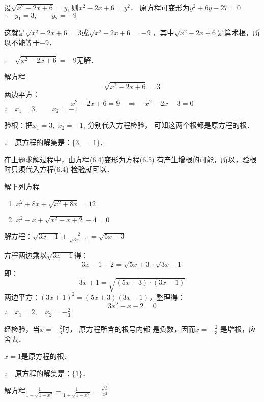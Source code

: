 \begin{solution}
    设$\sqrt{x^2-2x+6}=y$, 则$x^2-2x+6=y^2$．
原方程可变形为$y^2+6y-27=0$
$\because\quad y_1=3,\qquad y_2=-9$

这就是$\sqrt{x^2-2x+6}=3$或$\sqrt{x^2-2x+6}=-9$
，其中$\sqrt{x^2-2x+6}$是算术根，所以不能等于$-9$．

$\therefore\quad \sqrt{x^2-2x+6}=-9$无解．

解方程
\begin{equation}
    \sqrt{x^2-2x+6}=3
\end{equation}
两边平方：
\begin{equation}
    x^2-2x+6=9 \quad \Rightarrow\quad  x^2-2x-3=0
\end{equation}
$\therefore\quad x_1=3,\qquad x_2=-1$

验根：把$x_1=3,\; x_2=-1$, 分别代入方程检验，
可知这两个根都是原方程的根．

$\therefore\quad $原方程的解集是：$\{3,\;-1\}$．
\end{solution}

在上题求解过程中，由方程(6.4)变形为方程(6.5)
有产生增根的可能，所以，验根时只须代入方程(6.4)
检验就可以．

\begin{ex}
    解下列方程
    \begin{enumerate}
        \item $x^2+8x+\sqrt{x^2+8x}=12$
        \item $x^2-x+\sqrt{x^2-x+2}-4=0$
    \end{enumerate}
\end{ex}

\begin{example}
    解方程：$\sqrt{3x-1}+\frac{2}{\sqrt{3x-1}}=\sqrt{5x+3}$
\end{example}

\begin{solution}
    方程两边乘以$\sqrt{3x-1}$得：
\[3x-1+2=\sqrt{5x+3}\cdot \sqrt{3x-1} \]
即：
\[3x+1=\sqrt{(5x+3)\cdot (3x-1)}\]
两边平方：$(3x+1)^2=(5x+3)  (3x-1)$，整理得：
\[3x^2-x-2=0 \]
$\therefore\quad x_1=2,\quad x_2=-\frac{2}{3}$

经检验，当$x=-\frac{2}{3}$时，
原方程所含的根号内都
是负数，因而$x=-\frac{2}{3}$
是增根，应舍去．

$x=1$是原方程的根．

$\therefore\quad $原方程的解集是：$\{1\}$．
\end{solution}

\begin{example}
    解方程$\frac{1}{1-\sqrt{1-x^2}}-\frac{1}{1+\sqrt{1-x^2}}=\frac{\sqrt{3}}{x^2}$
\end{example}

